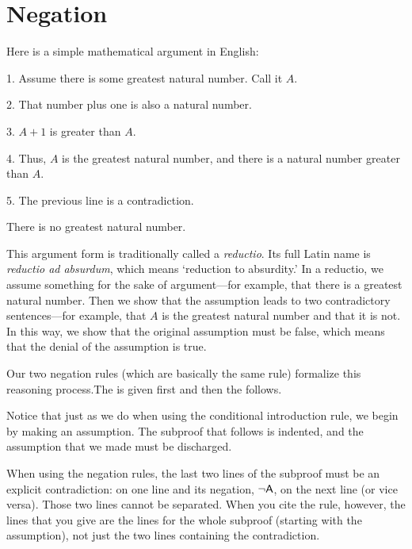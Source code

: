 \section{Negation}
Here is a simple mathematical argument in English:
\begin{earg}
\item[1.] Assume there is some greatest natural number. Call it $A$.
\item[2.] That number plus one is also a natural number.
\item[3.] $A+1$ is greater than $A$.
\item[4.] Thus, $A$ is the greatest natural number, and there is a natural number greater than $A$.
\item[5.] The previous line is a contradiction.
\item[\therefore] There is no greatest natural number.
\end{earg}
This argument form is traditionally called a \emph{reductio}. Its full Latin name is \emph{reductio ad absurdum}, which means `reduction to absurdity.' In a reductio, we assume something for the sake of argument---for example, that there is a greatest natural number. Then we show that the assumption leads to two contradictory sentences---for example, that $A$ is the greatest natural number and that it is not. In this way, we show that the original assumption must be false, which means that the denial of the assumption is true. 

Our two negation rules (which are basically the same rule) formalize this reasoning process.The  is given first and then the  follows.


\noindent Notice that just as we do when using the conditional introduction rule, we begin by making an assumption. The subproof that follows is indented, and the assumption that we made must be discharged. 

When using the negation rules, the last two lines of the subproof must be an explicit contradiction:  on one line and its negation, ${\neg}\mathsf{A}$, on the next line (or vice versa). Those two lines cannot be separated. When you cite the rule, however, the lines that you give are the lines for the whole subproof (starting with the assumption), not just the two lines containing the contradiction. 

